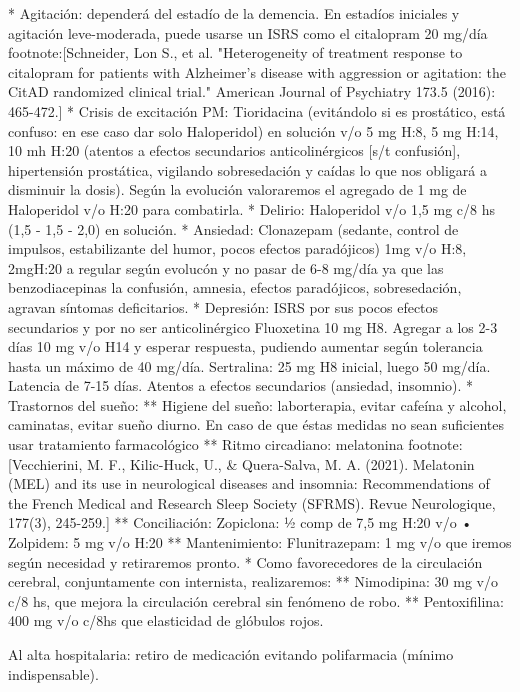 \documentclass{scrbook}
\begin{document}
* Agitación: dependerá del estadío de la demencia. En estadíos iniciales y agitación leve-moderada, puede usarse un ISRS como el citalopram 20 mg/día footnote:[Schneider, Lon S., et al. "Heterogeneity of treatment response to citalopram for patients with Alzheimer’s disease with aggression or agitation: the CitAD randomized clinical trial." American Journal of Psychiatry 173.5 (2016): 465-472.]
* Crisis de excitación PM: Tioridacina (evitándolo si es prostático, está confuso: en ese caso dar solo Haloperidol) en solución v/o 5 mg H:8, 5 mg H:14, 10 mh H:20 (atentos a efectos secundarios anticolinérgicos [s/t confusión], hipertensión prostática, vigilando sobresedación y caídas lo que nos obligará a disminuir la dosis). Según la evolución valoraremos el agregado de 1 mg de Haloperidol v/o H:20 para combatirla.
* Delirio: Haloperidol v/o 1,5 mg c/8 hs (1,5 - 1,5 - 2,0) en solución.
* Ansiedad: Clonazepam (sedante, control de impulsos, estabilizante del humor, pocos efectos paradójicos) 1mg v/o H:8, 2mgH:20 a regular según evolucón y no pasar de 6-8 mg/día ya que las benzodiacepinas la confusión, amnesia, efectos paradójicos, sobresedación, agravan síntomas deficitarios.
* Depresión: ISRS por sus pocos efectos secundarios y por no ser anticolinérgico Fluoxetina 10 mg H8. Agregar a los 2-3 días 10 mg v/o H14 y esperar respuesta, pudiendo aumentar según tolerancia hasta un máximo de 40 mg/día. Sertralina: 25 mg H8 inicial, luego 50 mg/día. Latencia de 7-15 días. Atentos a efectos secundarios (ansiedad, insomnio).
* Trastornos del sueño:
** Higiene del sueño: laborterapia, evitar cafeína y alcohol, caminatas, evitar sueño diurno. En caso de que éstas medidas no sean suficientes usar tratamiento farmacológico
** Ritmo circadiano: melatonina footnote:[Vecchierini, M. F., Kilic-Huck, U., \& Quera-Salva, M. A. (2021). Melatonin (MEL) and its use in neurological diseases and insomnia: Recommendations of the French Medical and Research Sleep Society (SFRMS). Revue Neurologique, 177(3), 245-259.]
** Conciliación:  Zopiclona: ½ comp de 7,5 mg H:20 v/o • Zolpidem: 5 mg v/o H:20
** Mantenimiento: Flunitrazepam: 1 mg v/o que iremos según necesidad y retiraremos pronto.
* Como favorecedores de la circulación cerebral, conjuntamente con internista, realizaremos:
** Nimodipina: 30 mg v/o c/8 hs, que mejora la circulación cerebral sin fenómeno de robo.
** Pentoxifilina: 400 mg v/o c/8hs que elasticidad de glóbulos rojos.

Al alta hospitalaria: retiro de medicación evitando polifarmacia (mínimo indispensable).
\end{document}
